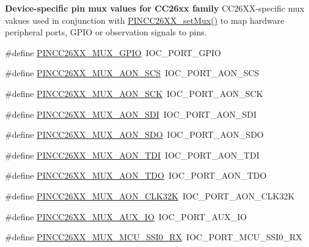 \begin{Indent}{\bf Device-\/specific pin mux values for C\-C26xx family}
{C\-C26\-X\-X-\/specific mux vakues used in conjunction with \hyperlink{_p_i_n_c_c26_x_x_8h_ac8cbb649db80dd03d8e8a487aef43294}{P\-I\-N\-C\-C26\-X\-X\-\_\-set\-Mux()} to map hardware peripheral ports, G\-P\-I\-O or observation signals to pins. }\begin{DoxyCompactItemize}
\item 
\#define \hyperlink{_p_i_n_c_c26_x_x_8h_afc65e6d65f939680cc596a207713b5c4}{P\-I\-N\-C\-C26\-X\-X\-\_\-\-M\-U\-X\-\_\-\-G\-P\-I\-O}~I\-O\-C\-\_\-\-P\-O\-R\-T\-\_\-\-G\-P\-I\-O
\item 
\#define \hyperlink{_p_i_n_c_c26_x_x_8h_aaec6571cc330fad7cc0f456ce92e54c0}{P\-I\-N\-C\-C26\-X\-X\-\_\-\-M\-U\-X\-\_\-\-A\-O\-N\-\_\-\-S\-C\-S}~I\-O\-C\-\_\-\-P\-O\-R\-T\-\_\-\-A\-O\-N\-\_\-\-S\-C\-S
\item 
\#define \hyperlink{_p_i_n_c_c26_x_x_8h_a4dd135e99cb2ef3c9d6025b927b65d4b}{P\-I\-N\-C\-C26\-X\-X\-\_\-\-M\-U\-X\-\_\-\-A\-O\-N\-\_\-\-S\-C\-K}~I\-O\-C\-\_\-\-P\-O\-R\-T\-\_\-\-A\-O\-N\-\_\-\-S\-C\-K
\item 
\#define \hyperlink{_p_i_n_c_c26_x_x_8h_a9a32e54a0307edd69c4f398ee243e555}{P\-I\-N\-C\-C26\-X\-X\-\_\-\-M\-U\-X\-\_\-\-A\-O\-N\-\_\-\-S\-D\-I}~I\-O\-C\-\_\-\-P\-O\-R\-T\-\_\-\-A\-O\-N\-\_\-\-S\-D\-I
\item 
\#define \hyperlink{_p_i_n_c_c26_x_x_8h_a9a26180801d733cc5141d9d4bfe32fb8}{P\-I\-N\-C\-C26\-X\-X\-\_\-\-M\-U\-X\-\_\-\-A\-O\-N\-\_\-\-S\-D\-O}~I\-O\-C\-\_\-\-P\-O\-R\-T\-\_\-\-A\-O\-N\-\_\-\-S\-D\-O
\item 
\#define \hyperlink{_p_i_n_c_c26_x_x_8h_ad451f024f76688fc7eb41557536db30b}{P\-I\-N\-C\-C26\-X\-X\-\_\-\-M\-U\-X\-\_\-\-A\-O\-N\-\_\-\-T\-D\-I}~I\-O\-C\-\_\-\-P\-O\-R\-T\-\_\-\-A\-O\-N\-\_\-\-T\-D\-I
\item 
\#define \hyperlink{_p_i_n_c_c26_x_x_8h_a431c98678be9df655e80bc7e2386e9dc}{P\-I\-N\-C\-C26\-X\-X\-\_\-\-M\-U\-X\-\_\-\-A\-O\-N\-\_\-\-T\-D\-O}~I\-O\-C\-\_\-\-P\-O\-R\-T\-\_\-\-A\-O\-N\-\_\-\-T\-D\-O
\item 
\#define \hyperlink{_p_i_n_c_c26_x_x_8h_a99871b823a34287bfc2027606551db4d}{P\-I\-N\-C\-C26\-X\-X\-\_\-\-M\-U\-X\-\_\-\-A\-O\-N\-\_\-\-C\-L\-K32\-K}~I\-O\-C\-\_\-\-P\-O\-R\-T\-\_\-\-A\-O\-N\-\_\-\-C\-L\-K32\-K
\item 
\#define \hyperlink{_p_i_n_c_c26_x_x_8h_a7fc71cdd74fbd97d4297ffed39302713}{P\-I\-N\-C\-C26\-X\-X\-\_\-\-M\-U\-X\-\_\-\-A\-U\-X\-\_\-\-I\-O}~I\-O\-C\-\_\-\-P\-O\-R\-T\-\_\-\-A\-U\-X\-\_\-\-I\-O
\item 
\#define \hyperlink{_p_i_n_c_c26_x_x_8h_ac72b13e3e19d75a4ce2240955786660d}{P\-I\-N\-C\-C26\-X\-X\-\_\-\-M\-U\-X\-\_\-\-M\-C\-U\-\_\-\-S\-S\-I0\-\_\-\-R\-X}~I\-O\-C\-\_\-\-P\-O\-R\-T\-\_\-\-M\-C\-U\-\_\-\-S\-S\-I0\-\_\-\-R\-X

\end{DoxyCompactItemize}
\end{Indent}
